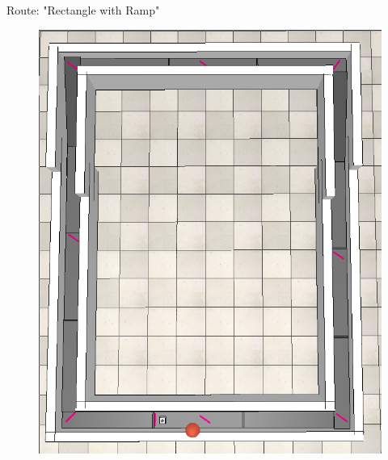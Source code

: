 \documentclass[10pt]{beamer}
\begin{document}
\begin{frame}{Route: "Rectangle with Ramp"}
    \begin{figure}
        \centering
        \includegraphics[angle=90,width=0.9\linewidth]{routes/rectangle_with_ramp.png}
    \end{figure}
\end{frame}
\end{document}
